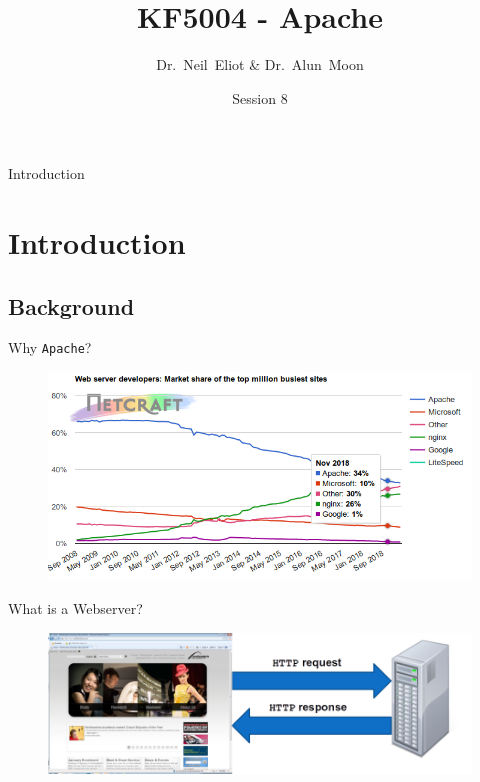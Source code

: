 \documentclass[xcolor=table,aspectratio=169]{beamer}
\title{KF5004 - Apache}
\author{Dr.~Neil~Eliot \& Dr.~Alun~Moon}
\institute[Northumbria University] %
{
  Department of Computer and Information Sciences\\
  University of Northumbria
}
\date{Session 8}
\begin{document}
\begin{frame}
  \titlepage
\end{frame}

\begin{frame}{Introduction}
  \tableofcontents
\end{frame}


\section{Introduction}
\subsection{Background}
\begin{frame}{Why \texttt{Apache}?}
    \begin{figure}
      \begin{center}
        \includegraphics[width=0.8\linewidth]{Market.png}
      \end{center}
    \end{figure}
\end{frame}

\begin{frame}{What is a Webserver?}
  \begin{figure}
    \begin{center}
      \includegraphics[width=0.8\linewidth]{What.png}
    \end{center}
  \end{figure}
\end{frame}
\end{document}
